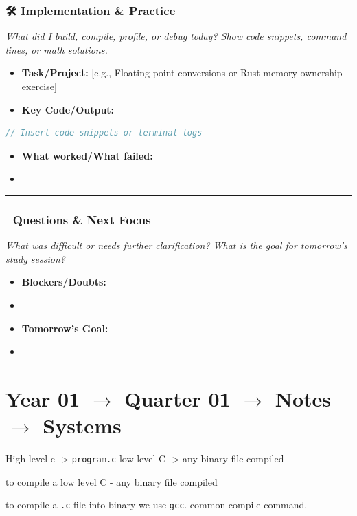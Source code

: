 \documentclass[11pt,a4paper]{report}
\begin{document}
\subsection{🛠️ Implementation \& Practice}
\textit{What did I build, compile, profile, or debug today? Show code snippets, command lines, or math solutions.}

\begin{itemize}
  \item \textbf{Task/Project:} [e.g., Floating point conversions or Rust memory ownership exercise]
  \item \textbf{Key Code/Output:}
\end{itemize}
\begin{lstlisting}[language=Rust]
  // Insert code snippets or terminal logs
\end{lstlisting}
\begin{itemize}
  \item \textbf{What worked/What failed:}
  \item 

\end{itemize}
\noindent\rule{\textwidth}{0.4pt}

\subsection{🧠 Questions \& Next Focus}
\textit{What was difficult or needs further clarification? What is the goal for tomorrow's study session?}

\begin{itemize}
  \item \textbf{Blockers/Doubts:}
  \item 
  \item \textbf{Tomorrow's Goal:}
  \item 

\end{itemize}
\newpage

\chapter{Year 01 $\rightarrow$ Quarter 01 $\rightarrow$ Notes $\rightarrow$ Systems}
High level c -\textgreater{} \texttt{program.c}
low level C -\textgreater{} any binary file compiled

to compile a 
low level C - any binary file compiled

to compile a \texttt{.c} file into binary we use \texttt{gcc}.
common compile command.
\end{document}
